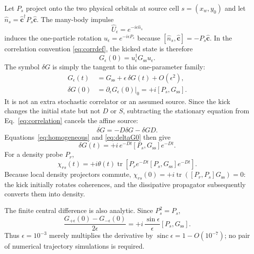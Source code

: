 \documentclass[aps,prb,twocolumn,nofootinbib,superscriptaddress,floatfix]{revtex4-2}
\newcommand{\tr}{\operatorname{tr}}
\newcommand{\Gss}{G_{\mathrm{ss}}}
\begin{document}
Let $P_s$ project onto the two physical orbitals at source cell
$s=(x_w,y_0)$ and let
$\hat n_s=\hat{\boldsymbol c}^{\dagger}P_s\hat{\boldsymbol c}$. The
many-body impulse
\begin{equation}
 \hat U_\epsilon=e^{-i\epsilon\hat n_s}
\end{equation}
induces the one-particle rotation
$u_\epsilon=e^{-i\epsilon P_s}$ because
$[\hat n_s,\hat{\boldsymbol c}]=-P_s\hat{\boldsymbol c}$. In the correlation
convention \eqref{eq:corrdef}, the kicked state is therefore
\begin{equation}
 G_\epsilon(0)=u_\epsilon^\dagger\Gss u_\epsilon.
 \label{eq:kickedG}
\end{equation}
The symbol $\delta G$ is simply the tangent to this one-parameter family:
\begin{align}
 G_\epsilon(t)&=\Gss+\epsilon\,\delta G(t)+O(\epsilon^2),\\
 \delta G(0)&=\left.\partial_\epsilon G_\epsilon(0)\right|_0
 =+i[P_s,\Gss].\label{eq:deltaG0}
\end{align}
It is not an extra stochastic correlator or an assumed source. Since the kick
changes the initial state but not $D$ or $S$, subtracting the stationary
equation from Eq.~\eqref{eq:correlation} cancels the affine source:
\begin{equation}
 \dot{\delta G}=-D\delta G-\delta GD.
\end{equation}
Equations~\eqref{eq:homogeneous} and \eqref{eq:deltaG0} then give
\begin{equation}
 \boxed{\delta G(t)=+i\,e^{-Dt}[P_s,\Gss]e^{-Dt}.}
 \label{eq:exactdeltaG}
\end{equation}
For a density probe $P_r$,
\begin{equation}
 \boxed{\chi_{rs}(t)=+i\theta(t)\tr\!\left[
 P_r e^{-Dt}[P_s,\Gss]e^{-Dt}\right].}
 \label{eq:response}
\end{equation}
Because local density projectors commute,
$\chi_{rs}(0)=+i\tr([P_r,P_s]\Gss)=0$: the kick initially rotates
coherences, and the dissipative propagator subsequently converts them into
density.

The finite central difference is also analytic. Since $P_s^2=P_s$,
\begin{equation}
 \frac{G_{+\epsilon}(0)-G_{-\epsilon}(0)}{2\epsilon}
 =+i\,\frac{\sin\epsilon}{\epsilon}[P_s,\Gss].
 \label{eq:sinc}
\end{equation}
Thus $\epsilon=10^{-3}$ merely multiplies the derivative by
$\operatorname{sinc}\epsilon=1-O(10^{-7})$; no pair of numerical trajectory
simulations is required.
\end{document}
